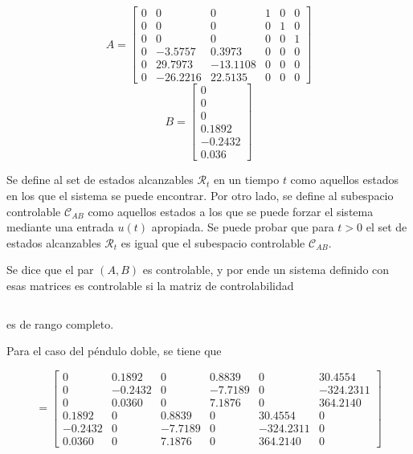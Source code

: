 \begin{equation}
 A = \begin{bmatrix}
0 &  0 & 0 & 1 &  0 & 0\\
0 &  0 & 0 & 0 &  1 & 0\\
0 &  0 & 0 & 0 &  0 & 1\\
0 &  -3.5757 & 0.3973 & 0 &  0 & 0\\
0 &  29.7973 & -13.1108 & 0 &  0 & 0\\
0 &  -26.2216 & 22.5135 & 0 &  0 & 0
\end{bmatrix}
\end{equation}
\begin{equation}
 B = \begin{bmatrix}
0 \\
0 \\
0 \\
0.1892 \\
-0.2432 \\
0.036 
\end{bmatrix}
\end{equation}


Se define al set de estados alcanzables $\mathcal{R}_t$ en un tiempo $t$ como aquellos estados en los que el sistema se puede encontrar. Por otro lado, se define al subespacio controlable $\mathcal{C}_{AB}$ como aquellos estados a los que se puede forzar el sistema mediante una entrada $u(t)$ apropiada. Se puede probar que para $t > 0$ el set de estados alcanzables $\mathcal{R}_t$ es igual que el subespacio controlable $\mathcal{C}_{AB}$.

Se dice que el par $(A, B)$ es controlable, y por ende un sistema definido con esas matrices es controlable si la matriz de controlabilidad

\begin{equation}
[B \ AB \ \cdots \ A^{n-1}B]
\end{equation}

es de rango completo.

Para el caso del péndulo doble, se tiene que

\begin{equation}
[B \ AB \ \cdots \ A^{n-1}B] = 	\begin{bmatrix}
0       &  0.1892  & 0        & 0.8839  &  0         & 30.4554\\
0       &  -0.2432 & 0        & -7.7189 &  0         & -324.2311\\
0       &  0.0360  & 0        & 7.1876  &  0         & 364.2140\\
0.1892  &  0       & 0.8839   & 0       &  30.4554   & 0\\
-0.2432 &  0       & -7.7189  & 0       &  -324.2311 & 0\\
0.0360  &  0       & 7.1876   & 0       &  364.2140  & 0
\end{bmatrix}
\end{equation}

